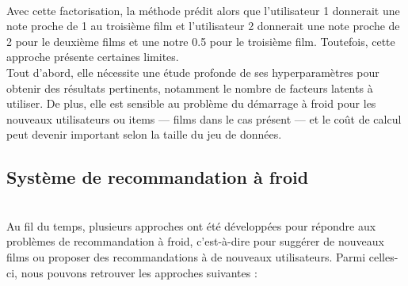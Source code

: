 \documentclass{article}
\begin{document}
\\
Avec cette factorisation, la méthode prédit alors que l’utilisateur 1 donnerait une note proche de 1 au troisième film et 
l’utilisateur 2 donnerait une note proche de 2 pour le deuxième films et une notre 0.5 pour le troisième film. Toutefois, cette approche présente certaines limites.\\
Tout d’abord, elle nécessite une étude profonde de ses hyperparamètres pour obtenir des résultats pertinents, notamment le nombre de facteurs latents à utiliser.
De plus, elle est sensible au problème du démarrage à froid pour les nouveaux utilisateurs ou items — films dans le cas présent — 
et le coût de calcul peut devenir important selon la taille du jeu de données.

\subsection{Système de recommandation à froid}
$ $\\
Au fil du temps, plusieurs approches ont été développées pour répondre aux problèmes de recommandation à froid, 
c’est-à-dire pour suggérer de nouveaux films ou proposer des recommandations à de nouveaux utilisateurs. 
Parmi celles-ci, nous pouvons retrouver les approches suivantes :
\end{document}

